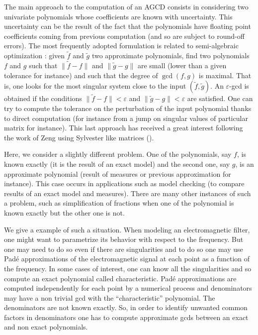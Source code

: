 \documentclass{article}
\begin{document}
The main approach to the computation of an AGCD consists in considering two
univariate polynomials whose coefficients are known with uncertainty. This
uncertainty can be the result of the fact that the polynomials have floating
point coefficients coming from previous computation (and so are subject to
round-off errors). The most frequently adopted formulation is related to
semi-algebraic optimization : given $\tilde{f}$ and $\tilde{g}$ two
approximate polynomials, find two polynomials $f$ and $g$ such that $\|
\tilde{f} - f\|$ and $\| \tilde{g} - g\|$ are small (lower than a given
tolerance for instance) and such that the degree of $\gcd (f, g)$ is maximal.
That is, one looks for the most singular system close to the input $(
\tilde{f}, \tilde{g})$. An $\varepsilon$-gcd is obtained if the conditions $\|
\tilde{f} - f\|< \varepsilon$ and $\| \tilde{g} - g\|< \varepsilon$ are
satisfied. One can try to compute the tolerance on the perturbation of the
input polynomial thanks to direct computation (for instance from a jump on
singular values of particular matrix for instance). This last approach has
received a great interest following the work of Zeng using Sylvester like
matrices ({\cite{Zeng}}). \

Here, we consider a slightly different problem. One of the polynomials, say
$f$, is known exactly (it is the result of an exact model) and the second one,
say $g$, is an approximate polynomial (result of measures or previous
approximation for instance). This case occurs in applications such as model
checking (to compare results of an exact model and measures). There are many
other instances of such a problem, such as simplification of fractions when
one of the polynomial is known exactly but the other one is not.

We give a example of such a situation. When modeling an electromagnetic
filter, one might want to parametrize its behavior with respect to the
frequency. But one may need to do so even if there are singularities and to do
so one may use Pad\'e approximations of the electromagnetic signal at each
point as a function of the frequency. In some cases of interest, one can know
all the singularities and so compute an exact polynomial called
characteristic. Pad\'e approximations are computed independently for each
point by a numerical process and denominators may have a non trivial gcd with
the ``characteristic'' polynomial. The denominators are not known exactly. So,
in order to identify unwanted common factors in denominators one has to
compute approximate gcds between an exact and non exact polynomials.
\end{document}
